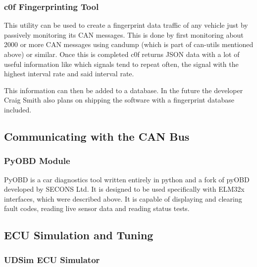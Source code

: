 \subsubsection{c0f Fingerprinting Tool}
This utility can be used to create a fingerprint data traffic of any vehicle just by passively monitoring its CAN messages. This is done by first monitoring about 2000 or more CAN messages using candump (which is part of can-utils mentioned above) or similar. Once this is completed c0f returns JSON data with a lot of useful information like which signals tend to repeat often, the signal with the highest interval rate and said interval rate.

This information can then be added to a database. In the future the developer Craig Smith also plans on shipping the software with a fingerprint database included.

\subsection{Communicating with the CAN Bus}
\subsubsection{PyOBD Module}
PyOBD is a car diagnostics tool written entirely in python and a fork of pyOBD developed by SECONS Ltd. It is designed to be used specifically with ELM32x interfaces, which were described above. It is capable of displaying and clearing fault codes, reading live sensor data and reading status tests.





\subsection{ECU Simulation and Tuning}
\subsubsection{UDSim ECU Simulator}


